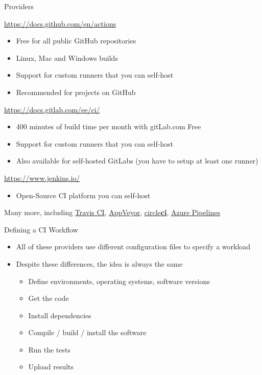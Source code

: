 \begin{frame}[c]{Providers}
  \begin{description}
    \item[GitHub Actions] \url{https://docs.github.com/en/actions}
      \begin{itemize}
        \item Free for all public GitHub repositories
        \item Linux, Mac and Windows builds
        \item Support for custom runners that you can self-host
        \item Recommended for projects on GitHub
      \end{itemize}
    \item[GitLab CI] \url{https://docs.gitlab.com/ee/ci/}
      \begin{itemize}
        \item 400 minutes of build time per month with gitLab.com Free
        \item Support for custom runners that you can self-host
        \item Also available for self-hosted GitLabs (you have to setup at least one runner)
      \end{itemize}
    \item[Jenkins] \url{https://www.jenkins.io/}
      \begin{itemize}
        \item Open-Source CI platform you can self-host
      \end{itemize}
  \end{description}

  Many more, including \href{https://travis-ci.com/}{Travis CI}, \href{https://www.appveyor.com/}{AppVeyor}, \href{https://circleci.com/}{circle\textbf{ci}}, \href{https://azure.microsoft.com/de-de/services/devops/pipelines/}{Azure Pipelines}
\end{frame}

\begin{frame}[c]{Defining a CI Workflow}
  \begin{itemize}
    \item All of these providers use different configuration files to specify a workload
    \item Despite these differences, the idea is always the same
      \begin{itemize}
        \item Define environments, operating systems, software versions
        \item Get the code
        \item Install dependencies
        \item Compile / build / install the software
        \item Run the tests
        \item Upload results
      \end{itemize}
  \end{itemize}
\end{frame}

